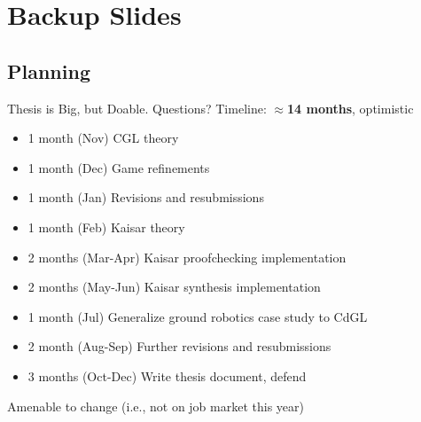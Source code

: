 \documentclass[slidestop,aspectratio=169]{beamer}
\newcommand{\CGL}{CGL\xspace}
\newcommand{\CdGL}{CdGL\xspace}
\theoremstyle{plain}
\theoremstyle{definition}
\theoremstyle{remark}
\begin{document}
\appendix

\section{Backup Slides}

\subsection{Planning}

\begin{frame}[t]{Thesis is Big, but Doable. Questions?}
Timeline: $\approx$\textbf{14 months}, optimistic
\begin{itemize}
\item 1 month (Nov) \CGL theory
\item 1 month (Dec) Game refinements
\item 1 month (Jan) Revisions and resubmissions
\item 1 month (Feb) Kaisar theory
\item 2 months (Mar-Apr) Kaisar proofchecking implementation
\item 2 months (May-Jun) Kaisar synthesis implementation
\item 1 month (Jul) Generalize ground robotics case study to \CdGL
\item 2 month (Aug-Sep) Further revisions and resubmissions
\item 3 months (Oct-Dec) Write thesis document, defend
\end{itemize}
Amenable to change (i.e., not on job market this year)
\end{frame}
\end{document}
